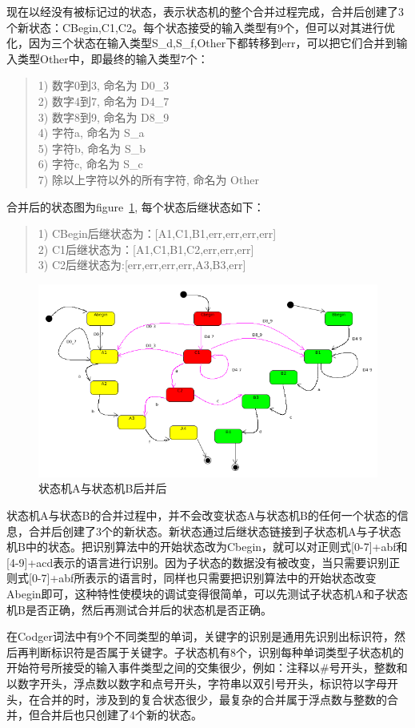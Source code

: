 现在以经没有被标记过的状态，表示状态机的整个合并过程完成，合并后创建了3个新状态：CBegin,C1,C2。每个状态接受的输入类型有9个，但可以对其进行优化，因为三个状态在输入类型S\_d,S\_f,Other下都转移到err，可以把它们合并到输入类型Other中，即最终的输入类型7个：
\begin{quote}
1) 数字0到3, 命名为 D0\_3 \\
2) 数字4到7, 命名为 D4\_7 \\
3) 数字8到9, 命名为 D8\_9 \\
4) 字符a,  命名为 S\_a \\
5) 字符b,  命名为 S\_b \\
6) 字符c,  命名为 S\_c \\
7) 除以上字符以外的所有字符, 命名为 Other
\end{quote}
合并后的状态图为figure~\ref{fig:state_c}, 每个状态后继状态如下：
\begin{quote}
1) CBegin后继状态为：[A1,C1,B1,err,err,err,err]  \\
2) C1后继状态为：[A1,C1,B1,C2,err,err,err] \\
3) C2后继状态为:[err,err,err,err,A3,B3,err] 
\end{quote}
\begin{figure}
\centering
\includegraphics[scale=0.8,angle=90]{s_c.png}
\caption{状态机A与状态机B后并后}
\label{fig:state_c}
\end{figure}
状态机A与状态B的合并过程中，并不会改变状态A与状态机B的任何一个状态的信息，合并后创建了3个的新状态。新状态通过后继状态链接到子状态机A与子状态机B中的状态。把识别算法中的开始状态改为Cbegin，就可以对正则式[0-7]+abf和[4-9]+acd表示的语言进行识别。因为子状态的数据没有被改变，当只需要识别正则式[0-7]+abf所表示的语言时，同样也只需要把识别算法中的开始状态改变Abegin即可，这种特性使模块的调试变得很简单，可以先测试子状态机A和子状态机B是否正确，然后再测试合并后的状态机是否正确。

在Codger词法中有9个不同类型的单词，关键字的识别是通用先识别出标识符，然后再判断标识符是否属于关键字。子状态机有8个，识别每种单词类型子状态机的开始符号所接受的输入事件类型之间的交集很少，例如：注释以\#号开头，整数和以数字开头，浮点数以数字和点号开头，字符串以双引号开头，标识符以字母开头，在合并的时，涉及到的复合状态很少，最复杂的合并属于浮点数与整数的合并，但合并后也只创建了4个新的状态。


